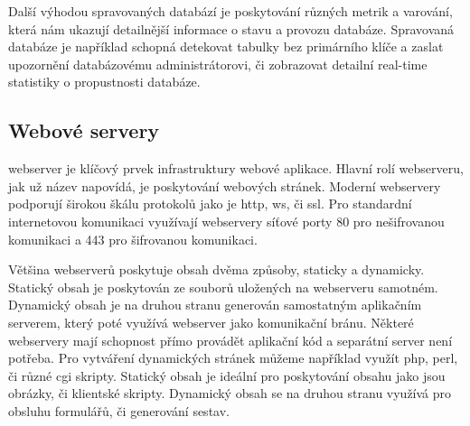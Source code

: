 Další výhodou spravovaných databází je poskytování různých metrik a varování, která nám ukazují detailnější informace o stavu a provozu databáze. Spravovaná databáze je například schopná detekovat tabulky bez primárního klíče a zaslat upozornění databázovému administrátorovi, či zobrazovat detailní \gls{real-time} statistiky o propustnosti databáze.

\subsection{Webové servery}

\acrfull{webserver}\cite{webserver} je klíčový prvek infrastruktury webové aplikace. Hlavní rolí \acrshort{webserver}u, jak už název napovídá, je poskytování webových stránek. Moderní \acrshort{webserver}y podporují širokou škálu protokolů jako je \acrfull{http}, \acrfull{ws}, či \acrfull{ssl}. Pro standardní internetovou komunikaci využívají \acrshort{webserver}y síťové porty 80 pro nešifrovanou komunikaci a 443 pro šifrovanou komunikaci. 

Většina \acrshort{webserver}ů poskytuje obsah dvěma způsoby, staticky a dynamicky. Statický obsah je poskytován ze souborů uložených na \acrshort{webserver}u samotném. Dynamický obsah je na druhou stranu generován samostatným aplikačním serverem, který poté využívá \acrshort{webserver} jako komunikační bránu. Některé \acrshort{webserver}y mají schopnost přímo provádět aplikační kód a separátní server není potřeba. Pro vytváření dynamických stránek můžeme například využít \acrshort{php}, \Gls{perl}, či různé \Gls{cgi} skripty. Statický obsah je ideální pro poskytování obsahu jako jsou obrázky, či klientské skripty. Dynamický obsah se na druhou stranu využívá pro obsluhu formulářů, či generování sestav.
